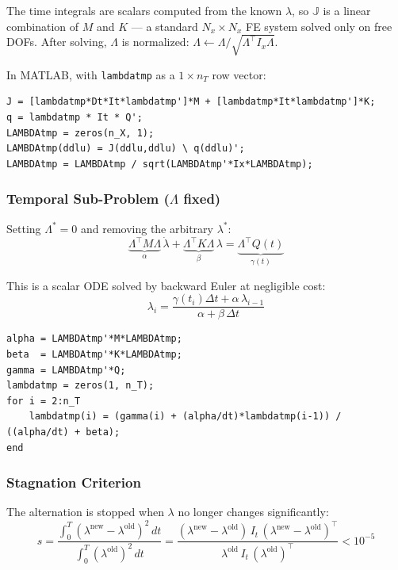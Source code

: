 \documentclass[11pt,a4paper]{article}
\begin{document}
The time integrals are scalars computed from the known $\lambda$, so $\mathbb{J}$ is a linear combination of $M$ and $K$ --- a standard $N_x \times N_x$ FE system solved only on free DOFs. After solving, $\Lambda$ is normalized: $\Lambda \leftarrow \Lambda / \sqrt{\Lambda^\top I_x \Lambda}$.

In MATLAB, with \texttt{lambdatmp} as a $1 \times n_T$ row vector:
\begin{lstlisting}
J = [lambdatmp*Dt*It*lambdatmp']*M + [lambdatmp*It*lambdatmp']*K;
q = lambdatmp * It * Q';
LAMBDAtmp = zeros(n_X, 1);
LAMBDAtmp(ddlu) = J(ddlu,ddlu) \ q(ddlu)';
LAMBDAtmp = LAMBDAtmp / sqrt(LAMBDAtmp'*Ix*LAMBDAtmp);
\end{lstlisting}

\subsubsection{Temporal Sub-Problem ($\Lambda$ fixed)}

Setting $\Lambda^* = 0$ and removing the arbitrary $\lambda^*$:
\begin{equation}
    \underbrace{\Lambda^\top M\Lambda}_{\alpha}\,\dot{\lambda} + \underbrace{\Lambda^\top K\Lambda}_{\beta}\,\lambda = \underbrace{\Lambda^\top Q(t)}_{\gamma(t)}
    \label{eq:ode}
\end{equation}

This is a scalar ODE solved by backward Euler at negligible cost:
\begin{equation}
    \lambda_i = \frac{\gamma(t_i)\Delta t + \alpha\,\lambda_{i-1}}{\alpha + \beta\,\Delta t}
\end{equation}

\begin{lstlisting}
alpha = LAMBDAtmp'*M*LAMBDAtmp;
beta  = LAMBDAtmp'*K*LAMBDAtmp;
gamma = LAMBDAtmp'*Q;
lambdatmp = zeros(1, n_T);
for i = 2:n_T
    lambdatmp(i) = (gamma(i) + (alpha/dt)*lambdatmp(i-1)) / ((alpha/dt) + beta);
end
\end{lstlisting}

\subsubsection{Stagnation Criterion}

The alternation is stopped when $\lambda$ no longer changes significantly:
\begin{equation}
    s = \frac{\int_0^T (\lambda^{\text{new}} - \lambda^{\text{old}})^2\,dt}{\int_0^T (\lambda^{\text{old}})^2\,dt} = \frac{(\lambda^{\text{new}}-\lambda^{\text{old}})\,I_t\,(\lambda^{\text{new}}-\lambda^{\text{old}})^\top}{\lambda^{\text{old}}\,I_t\,(\lambda^{\text{old}})^\top} < 10^{-5}
\end{equation}
\end{document}
